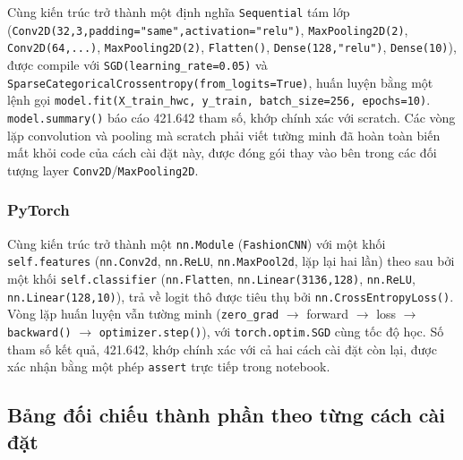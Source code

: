 \documentclass[11pt]{article}
\newcommand{\code}[1]{\texttt{#1}}
\begin{document}
Cùng kiến trúc trở thành một định nghĩa \code{Sequential} tám lớp
(\code{Conv2D(32,3,padding="same",activation="relu")},
\code{MaxPooling2D(2)}, \code{Conv2D(64,...)}, \code{MaxPooling2D(2)},
\code{Flatten()}, \code{Dense(128,"relu")}, \code{Dense(10)}), được compile
với \code{SGD(learning\_rate=0.05)} và
\code{SparseCategoricalCrossentropy(from\_logits=True)}, huấn luyện bằng
một lệnh gọi \code{model.fit(X\_train\_hwc, y\_train, batch\_size=256,
epochs=10)}. \code{model.summary()} báo cáo 421.642 tham số, khớp chính
xác với scratch. Các vòng lặp convolution và pooling mà scratch phải viết
tường minh đã hoàn toàn biến mất khỏi code của cách cài đặt này, được đóng
gói thay vào bên trong các đối tượng layer \code{Conv2D}/\code{MaxPooling2D}.

\subsubsection{PyTorch}

Cùng kiến trúc trở thành một \code{nn.Module} (\code{FashionCNN}) với một
khối \code{self.features} (\code{nn.Conv2d}, \code{nn.ReLU},
\code{nn.MaxPool2d}, lặp lại hai lần) theo sau bởi một khối
\code{self.classifier} (\code{nn.Flatten}, \code{nn.Linear(3136,128)},
\code{nn.ReLU}, \code{nn.Linear(128,10)}), trả về logit thô được tiêu thụ
bởi \code{nn.CrossEntropyLoss()}. Vòng lặp huấn luyện vẫn tường minh
(\code{zero\_grad} $\to$ forward $\to$ loss $\to$ \code{backward()}
$\to$ \code{optimizer.step()}), với \code{torch.optim.SGD} cùng tốc độ
học. Số tham số kết quả, 421.642, khớp chính xác với cả hai cách cài đặt
còn lại, được xác nhận bằng một phép \code{assert} trực tiếp trong notebook.

\subsection{Bảng đối chiếu thành phần theo từng cách cài đặt}
\end{document}
